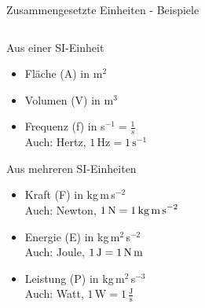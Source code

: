 \documentclass{beamer}
\begin{document}
\begin{frame}{Zusammengesetzte Einheiten - Beispiele}

\begin{columns}[c]

\begin{column}{6cm}
    \begin{block}{Aus einer SI-Einheit}
\begin{itemize}
    \item 
Fläche (A) in m$^2$
\item
Volumen (V) in m$^3$
\item
Frequenz (f) in s$^{-1} = \frac{1}{s}$ \\
Auch: Hertz, $1\,\text{Hz} =  1\,\text{s}^{-1}$ 
\end{itemize}
    
\end{block}


\begin{block}{Aus mehreren SI-Einheiten}
\begin{itemize}
    \item 
Kraft (F) in kg\,m\,s$^{-2}$ \\
Auch: Newton, $1\,\text{N} =  1\,\text{kg\,m\,s}^{-2}$
\item
Energie (E) in kg\,m$^2$\,s$^{-2}$ \\
Auch: Joule, $1\,\text{J} =  1\,\text{N\,m}$
\item
Leistung (P) in kg\,m$^2$\,s$^{-3}$ \\
Auch: Watt, $1\,\text{W} =  1\,\frac{\text{J}}{\text{s}}$
\end{itemize}
    
\end{block}


\end{column}

\begin{column}{5cm}


\end{column}
\end{columns}
\end{frame}
\end{document}
